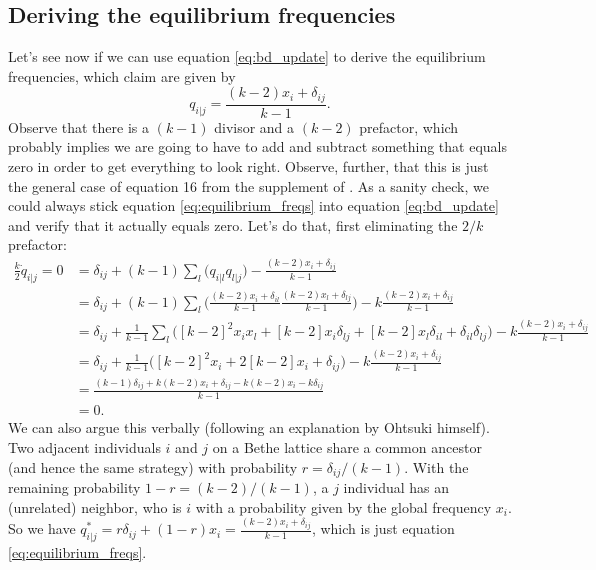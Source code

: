 \documentclass[14pt, justified]{tufte-handout}
\begin{document}
\subsection{Deriving the equilibrium frequencies}

Let's see now if we can use equation \ref{eq:bd_update} to derive the equilibrium frequencies, which \citet{ohtsuki.nowak_2006} claim are given by
\begin{equation}
    q_{i|j} = \frac{(k-2)x_i + \delta_{ij}}{k-1}.
    \label{eq:equilibrium_freqs}
\end{equation}
Observe that there is a $(k-1)$ divisor and a $(k-2)$ prefactor, which probably implies we are going to have to add and subtract something that equals zero in order to get everything to look right.
Observe, further, that this is just the general case of equation 16 from the supplement of \citet{ohtsuki.etal_2006}.
As a sanity check, we could always stick equation \ref{eq:equilibrium_freqs} into equation \ref{eq:bd_update} and verify that it actually equals zero.
Let's do that, first eliminating the $2/k$ prefactor:
\begin{equation}
    \begin{split}
        \frac{k}{2}\dot{q}_{i|j} = 0 & = \delta_{ij} + (k-1)\sum_l \Big( q_{i|l}q_{l|j} \Big) - \frac{(k-2)x_i + \delta_{ij}}{k-1}
        \\
        & = \delta_{ij} + (k-1)\sum_l \Big( \frac{(k-2)x_i + \delta_{il}}{k-1} \frac{(k-2)x_l + \delta_{lj}}{k-1} \Big) - k\frac{(k-2)x_i + \delta_{ij}}{k-1}
        \\
        & = \delta_{ij} + \frac{1}{k-1}\sum_l \Big( [k-2]^2 x_i x_l + [k-2]x_i \delta_{lj} + [k-2]x_l \delta_{il} + \delta_{il} \delta_{lj} \Big) - k\frac{(k-2)x_i + \delta_{ij}}{k-1}
        \\
        & = \delta_{ij} + \frac{1}{k-1} \Big( [k-2]^2 x_i + 2[k-2]x_i + \delta_{ij} \Big) - k\frac{(k-2)x_i + \delta_{ij}}{k-1}
        \\
        & = \frac{(k-1)\delta_{ij} + k(k-2)x_i + \delta_{ij} - k(k-2)x_i - k\delta_{ij}}{k-1}
        \\
        & = 0.
    \end{split}
\end{equation}
We can also argue this verbally (following an explanation by Ohtsuki himself).
Two adjacent individuals $i$ and $j$ on a Bethe lattice share a common ancestor (and hence the same strategy) with probability $r = \delta_{ij}/(k-1)$.
With the remaining probability $1 - r = (k-2)/(k-1)$, a $j$ individual has an (unrelated) neighbor, who is $i$ with a probability given by the global frequency $x_i$.
So we have $q_{i|j}^* = r\delta_{ij} + (1-r)x_i = \frac{(k-2)x_i + \delta_{ij}}{k-1}$, which is just equation \ref{eq:equilibrium_freqs}.
\end{document}
